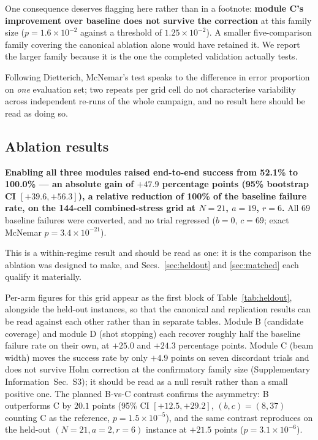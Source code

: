 \documentclass[preprint,11pt]{elsarticle}
\newcommand{\SI}{Supplementary Information}
\newcommand{\SItables}{\SI{}~Sec.~S3}
\begin{document}
One consequence deserves flagging here rather than in a footnote:
\textbf{module C's improvement over baseline does not survive the
correction} at this family size ($p=1.6\times10^{-2}$ against a threshold
of $1.25\times10^{-2}$). A smaller five-comparison family covering the
canonical ablation alone would have retained it. We report the larger
family because it is the one the completed validation actually tests.

Following Dietterich, McNemar's test speaks to the difference in error
proportion on \emph{one} evaluation set; two repeats per grid cell do not
characterise variability across independent re-runs of the whole
campaign, and no result here should be read as doing so.

\subsection{Ablation results}
\label{sec:results}

\textbf{Enabling all three modules raised end-to-end success from 52.1\%
to 100.0\% --- an absolute gain of $+47.9$ percentage points (95\%
bootstrap CI $[+39.6, +56.3]$), a relative reduction of 100\% of the
baseline failure rate, on the 144-cell combined-stress grid at $N=21$,
$a=19$, $r=6$.} All 69 baseline failures were converted, and no trial
regressed ($b=0$, $c=69$; exact McNemar $p=3.4\times10^{-21}$).

This is a within-regime result and should be read as one: it is the
comparison the ablation was designed to make, and Secs.~\ref{sec:heldout}
and \ref{sec:matched} each qualify it materially.

Per-arm figures for this grid appear as the first block of
Table~\ref{tab:heldout}, alongside the held-out instances, so that the
canonical and replication results can be read against each other rather
than in separate tables. Module B (candidate coverage) and module D (shot
stopping) each recover roughly half the baseline failure rate on their
own, at $+25.0$ and $+24.3$ percentage points. Module C (beam width)
moves the success rate by only $+4.9$ points on seven discordant trials
and does not survive Holm correction at the confirmatory family size
(\SItables{}); it should be read as a null result rather than a
small positive one. The planned B-vs-C contrast confirms the asymmetry:
B outperforms C by $20.1$ points (95\% CI $[+12.5,+29.2]$, $(b,c)=(8,37)$
counting C as the reference, $p=1.5\times10^{-5}$), and the same contrast
reproduces on the held-out $(N{=}21,a{=}2,r{=}6)$ instance at $+21.5$
points ($p=3.1\times10^{-6}$).
\end{document}

